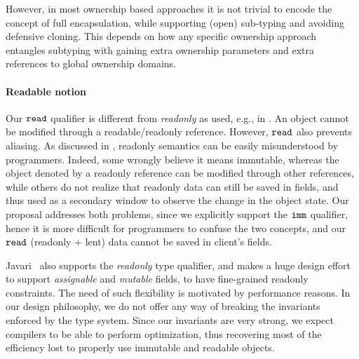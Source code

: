 However, in most ownership based approaches 
it is not trivial to encode the concept of full encapsulation, while supporting (open) sub-typing and avoiding defensive cloning.
This depends on how any specific ownership approach entangles subtyping with 
 gaining extra ownership parameters
and extra references to global ownership domains.

\paragraph{Readable notion} Our $\texttt{read}$ qualifier is different from \emph{readonly} as used, e.g., in \cite{BirkaErnst04}.
 An object cannot be modified through a readable/readonly reference. However, 
$\texttt{read}$ also prevents aliasing.
As discussed in \cite{Boyland06}, readonly semantics can be easily misunderstood by
programmers. Indeed, some wrongly believe it means immutable, whereas the object denoted by a readonly reference can be modified through other references, while others do not realize that readonly data can still be saved in fields, and thus used as a secondary window to observe the change in the object state.
Our proposal addresses both problems, since we explicitly support the $\texttt{imm}$ qualifier, hence it is more difficult for programmers to confuse the two concepts, and our $\texttt{read}$ (readonly + lent) data  cannot be saved in client's fields.

Javari~\cite{TschantzErnst05} also supports the \emph{readonly} type qualifier, and makes a huge design effort to support \emph{assignable} and \emph{mutable} fields, to have fine-grained readonly constraints.  The need of such flexibility is motivated by performance reasons.
In our design philosophy, we do not offer any way of breaking the invariants enforced by the type system. Since our invariants are very strong, we expect compilers to be able to perform optimization, thus recovering most of the efficiency lost to properly use immutable and readable objects.


